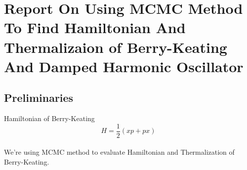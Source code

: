 \documentclass[12pt, letterpaper]{article}
\title{}
\begin{document}
    \section*{Report On Using MCMC Method To Find Hamiltonian And Thermalizaion of Berry-Keating And Damped Harmonic Oscillator}
    \subsection*{Preliminaries}
        Hamiltonian of Berry-Keating  
        \begin{equation}
            H = \frac{1}{2}(xp + px)
        \end{equation}
        \\
        
    

        We're using MCMC method to evaluate Hamiltonian and Thermalization of Berry-Keating. 
    
\end{document}

